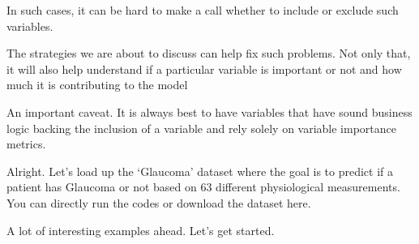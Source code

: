 \documentclass[]{book}
\begin{document}
In such cases, it can be hard to make a call whether to include or exclude such variables.

The strategies we are about to discuss can help fix such problems. Not only that, it will also help understand if a particular variable is important or not and how much it is contributing to the model

An important caveat. It is always best to have variables that have sound business logic backing the inclusion of a variable and rely solely on variable importance metrics.

Alright. Let's load up the `Glaucoma' dataset where the goal is to predict if a patient has Glaucoma or not based on 63 different physiological measurements. You can directly run the codes or download the dataset here.

A lot of interesting examples ahead. Let's get started.
\end{document}
